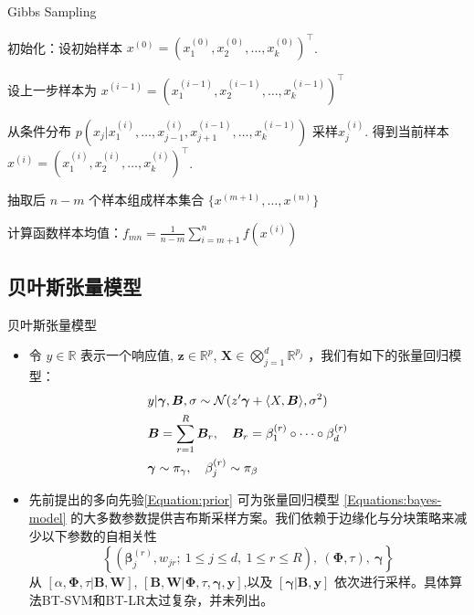 \documentclass{beamer}
\begin{document}
	\begin{frame}{Gibbs Sampling}
		\begin{center}
			\begin{minipage}{\textwidth}
				\begin{algorithm}[H]
					\small
					\caption{Gibbs Sampling（吉布斯抽样）}
					\label{Al:Gibbs}
					初始化：设初始样本 $x^{(0)} = (x_1^{(0)}, x_2^{(0)}, \dots, x_k^{(0)})^\top$.
					
					{
						设上一步样本为 $x^{(i-1)} = (x_1^{(i-1)}, x_2^{(i-1)}, \dots, x_k^{(i-1)})^\top$
						
						{
							从条件分布 $p(x_j | x_1^{(i)}, \dots, x_{j-1}^{(i)}, x_{j+1}^{(i-1)}, \dots, x_k^{(i-1)})$ 采样$x_j^{(i)}$.
						}
						得到当前样本 $x^{(i)} = (x_1^{(i)}, x_2^{(i)}, \dots, x_k^{(i)})^\top$.
					}
					抽取后 $n - m$ 个样本组成样本集合 $\{x^{(m+1)}, \dots, x^{(n)}\}$
					
					计算函数样本均值：$f_{mn} = \frac{1}{n - m} \sum_{i = m+1}^{n} f(x^{(i)})$
					
				\end{algorithm}
			\end{minipage}
		\end{center}
	\end{frame}

	\subsection{贝叶斯张量模型}
	\begin{frame}{贝叶斯张量模型}
		\begin{itemize}
			\item 令 \( y \in \mathbb{R} \) 表示一个响应值,  \( \mathbf{z} \in \mathbb{R}^p \), \( \mathbf{X} \in \bigotimes_{j=1}^{d} \mathbb{R}^{p_j} \)
			，我们有如下的张量回归模型：
				\begin{align}
					&y | \bm{\gamma}, \bm{B}, \sigma \sim \mathcal{N}(z^\prime \bm{\gamma} + \langle X, \bm{B} \rangle, \sigma^2) \notag \\
					&\bm{B} = \sum_{r=1}^{R} \bm{B}_r, \quad \bm{B}_r = \beta^{(r)}_1 \circ \cdots \circ \beta^{(r)}_d \notag \\
					&\bm{\gamma} \sim \pi_\gamma, \quad \beta^{(r)}_j \sim \pi_\beta \label{Equations:bayes-model}
				\end{align}
			\item 先前提出的多向先验\eqref{Equation:prior} 可为张量回归模型 \eqref{Equations:bayes-model} 的大多数参数提供吉布斯采样方案。我们依赖于边缘化与分块策略来减少以下参数的自相关性
			\[
			\left\{ \left( \bm{\beta}_j^{(r)}, w_{jr};\ 1 \leq j \leq d,\ 1 \leq r \leq R \right),\ (\bm{\Phi}, \tau),\ \bm{\gamma} \right\}
			\]
			从
			$[\alpha, \bm{\Phi}, \tau | \bm{B}, \bm{W}]$, $[\bm{B}, \bm{W} | \bm{\Phi}, \tau, \bm{\gamma}, \mathbf{y}]$,以及 $[\bm{\gamma} | \bm{B}, \mathbf{y}]$
			依次进行采样。具体算法BT-SVM和BT-LR太过复杂，并未列出。
		\end{itemize}
	\end{frame}
\end{document}

